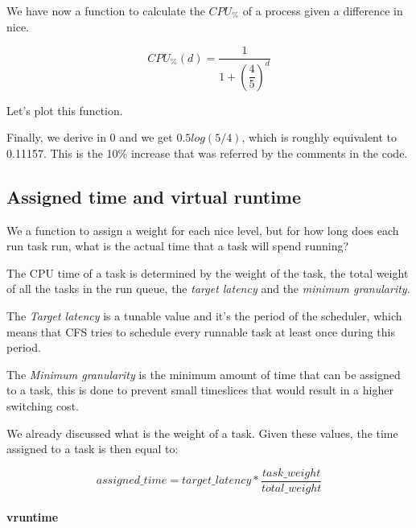 \documentclass[10pt]{book}
\begin{document}
We have now a function to calculate the $CPU_\%$ of a process given a difference in nice. 

\begin{equation}
    CPU_\%(d)=\frac{1}{1+\left(\dfrac{4}{5}\right)^{d}}
\end{equation}

Let's plot this function.


Finally, we derive in 0 and we get $0.5log(5/4)$, which is roughly equivalent to 0.11157. This is the 10\% increase that was referred by the comments in the code.

\subsection{Assigned time and virtual runtime}

We a function to assign a weight for each nice level, but for how long does each run task run, what is the actual time that a task will spend running?


The CPU time of a task is determined by the weight of the task, the total weight of all the tasks in the run queue, the \textit{target latency} and the \textit{minimum granularity}. 

The \textit{Target latency} is a tunable value and it's the period of the scheduler, which means that CFS tries to schedule every runnable task at least once during this period. 

The \textit{Minimum granularity} is the minimum amount of time that can be assigned to a task, this is done to prevent small timeslices that would result in a higher switching cost.

We already discussed what is the weight of a task. Given these values, the time assigned to a task is then equal to: 

\begin{equation}
    assigned\_time = target\_latency * \frac{task\_weight}{total\_weight}
\end{equation}

\paragraph{vruntime}
\end{document}
